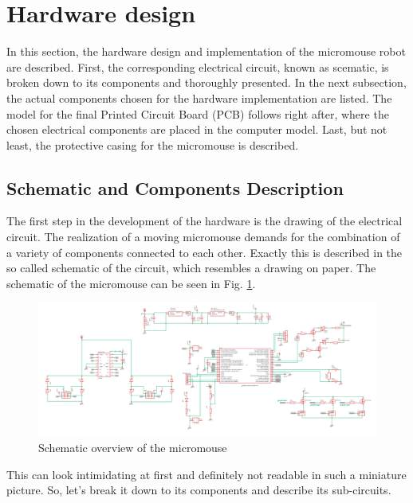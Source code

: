 \section{Hardware design} \label{chap:hardware}

In this section, the hardware design and implementation of the micromouse robot are described. First, the corresponding electrical circuit, known as scematic, is broken down to its components and thoroughly presented. In the next subsection, the actual components chosen for the hardware implementation are listed. The model for the final Printed Circuit Board (PCB) follows right after, where the chosen electrical components are placed in the computer model. Last, but not least, the protective casing for the micromouse is described.

\vspace{1cm}

\subsection{Schematic and Components Description}

The first step in the development of the hardware is the drawing of the electrical circuit. The realization of a moving micromouse demands for the combination of a variety of components connected to each other. Exactly this is described in the so called schematic of the circuit, which resembles a drawing on paper. 
The schematic of the micromouse can be seen in Fig. \ref{fig:schematic_overview}.

\begin{figure}[htb]
    \centering
    \includegraphics[width=1\textwidth]{figures/hardware/Schematic.PNG}
    \caption{Schematic overview of the micromouse}
    \label{fig:schematic_overview}
\end{figure}

This can look intimidating at first and definitely not readable in such a miniature picture. So, let's break it down to its components and describe its sub-circuits.

